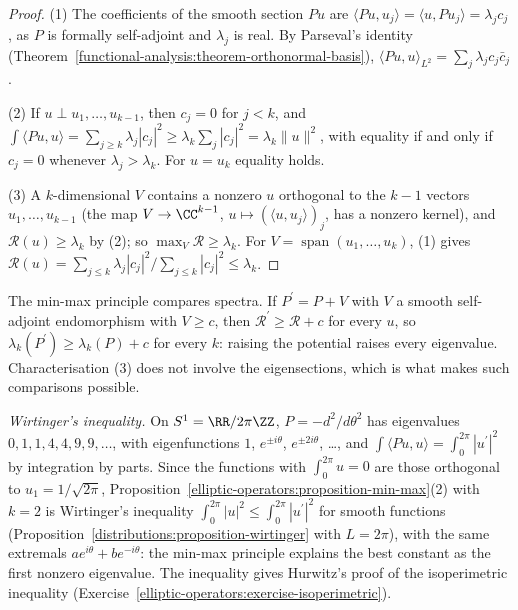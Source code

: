 \begin{proof}
(1) The coefficients of the smooth section $Pu$ are $\langle Pu, u_j\rangle = \langle u, Pu_j\rangle = \lambda_jc_j$, as $P$ is formally self-adjoint and $\lambda_j$ is real. By Parseval's identity
(Theorem~\ref{functional-analysis:theorem-orthonormal-basis}), $\langle Pu, u\rangle_{L^2} = \sum_j\lambda_jc_j\bar c_j$.

(2) If $u \perp u_1, \ldots, u_{k-1}$, then $c_j = 0$ for $j < k$, and $\int\langle Pu, u\rangle = \sum_{j \geq k}\lambda_j|c_j|^2 \geq \lambda_k\sum_j|c_j|^2 = \lambda_k\|u\|^2$, with equality if and only if $c_j = 0$ whenever
$\lambda_j > \lambda_k$. For $u = u_k$ equality holds.

(3) A $k$-dimensional $V$ contains a nonzero $u$ orthogonal to the $k - 1$ vectors $u_1, \ldots, u_{k-1}$ (the map $V \to \CC^{k-1}$, $u \mapsto (\langle u, u_j\rangle)_j$, has a nonzero kernel), and
$\mathcal{R}(u) \geq \lambda_k$ by (2); so $\max_V\mathcal{R} \geq \lambda_k$. For $V = \operatorname{span}(u_1, \ldots, u_k)$, (1) gives $\mathcal{R}(u) = \sum_{j \leq k}\lambda_j|c_j|^2/\sum_{j \leq k}|c_j|^2 \leq \lambda_k$.
\end{proof}

The min-max principle compares spectra. If $P^{\prime} = P + V$ with $V$ a smooth self-adjoint endomorphism with $V \geq c$, then $\mathcal{R}^{\prime} \geq \mathcal{R} + c$ for every $u$, so $\lambda_k(P^{\prime}) \geq \lambda_k(P) + c$ for every $k$: raising
the potential raises every eigenvalue. Characterisation (3) does not involve the eigensections, which is what makes such comparisons possible.

\begin{example}\label{elliptic-operators:example-wirtinger}
\emph{Wirtinger's inequality.} On $S^1 = \RR/2\pi\ZZ$, $P = -d^2/d\theta^2$ has eigenvalues $0, 1, 1, 4, 4, 9, 9, \ldots$, with eigenfunctions $1$, $e^{\pm i\theta}$, $e^{\pm2i\theta}$, \ldots, and
$\int\langle Pu, u\rangle = \int_0^{2\pi}|u^{\prime}|^2$ by integration by parts. Since the functions with $\int_0^{2\pi}u = 0$ are those orthogonal to $u_1 = 1/\sqrt{2\pi}$, Proposition~\ref{elliptic-operators:proposition-min-max}(2) with
$k = 2$ is Wirtinger's inequality $\int_0^{2\pi}|u|^2 \leq \int_0^{2\pi}|u^{\prime}|^2$ for smooth functions (Proposition~\ref{distributions:proposition-wirtinger} with $L = 2\pi$), with the same extremals $ae^{i\theta} + be^{-i\theta}$:
the min-max principle explains the best constant as the first nonzero eigenvalue. The inequality gives Hurwitz's proof of the isoperimetric inequality
(Exercise~\ref{elliptic-operators:exercise-isoperimetric}).
\end{example}

